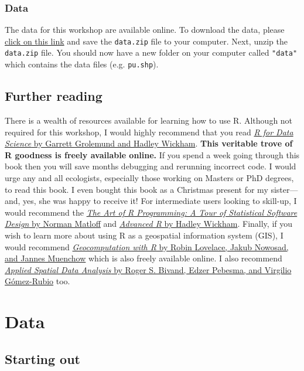 \documentclass[12pt,]{book}
\begin{document}
\subsection{Data}\label{data-setup}

The data for this workshop are available online. To download the data,
please
\href{https://github.com/prioritizr/massey-workshop/raw/master/data.zip}{click
on this link} and save the \texttt{data.zip} file to your computer.
Next, unzip the \texttt{data.zip} file. You should now have a new folder
on your computer called \texttt{"data"} which contains the data files
(e.g. \texttt{pu.shp}).

\section{Further reading}\label{further-reading}

There is a wealth of resources available for learning how to use R.
Although not required for this workshop, I would highly recommend that
you read \href{https://r4ds.had.co.nz/}{\emph{R for Data Science} by
Garrett Grolemund and Hadley Wickham}. \textbf{This veritable trove of R
goodness is freely available online.} If you spend a week going through
this book then you will save months debugging and rerunning incorrect
code. I would urge any and all ecologists, especially those working on
Masters or PhD degrees, to read this book. I even bought this book as a
Christmas present for my sister---and, yes, she was happy to receive it!
For intermediate users looking to skill-up, I would recommend the
\href{http://shop.oreilly.com/product/9781593273842.do}{\emph{The Art of
R Programming: A Tour of Statistical Software Design} by Norman Matloff}
and \href{https://adv-r.hadley.nz/}{\emph{Advanced R} by Hadley
Wickham}. Finally, if you wish to learn more about using R as a
geospatial information system (GIS), I would recommend
\href{https://geocompr.robinlovelace.net/}{\emph{Geocomputation with R}
by Robin Lovelace, Jakub Nowosad, and Jannes Muenchow} which is also
freely available online. I also recommend
\href{https://www.springer.com/gp/book/9781461476177}{\emph{Applied
Spatial Data Analysis} by Roger S. Bivand, Edzer Pebesma, and Virgilio
Gómez-Rubio} too.

\chapter{Data}\label{data}

\section{Starting out}\label{starting-out}
\end{document}

